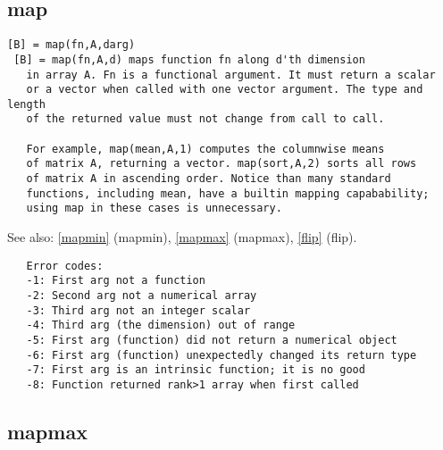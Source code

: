 \documentclass[a4paper]{article}
\begin{document}
\subsection{map\label{map}}

\begin{tscreen}
\begin{verbatim}
[B] = map(fn,A,darg)
 [B] = map(fn,A,d) maps function fn along d'th dimension
   in array A. Fn is a functional argument. It must return a scalar
   or a vector when called with one vector argument. The type and length
   of the returned value must not change from call to call.

   For example, map(mean,A,1) computes the columnwise means
   of matrix A, returning a vector. map(sort,A,2) sorts all rows
   of matrix A in ascending order. Notice than many standard
   functions, including mean, have a builtin mapping capabability;
   using map in these cases is unnecessary.
\end{verbatim}

See also: \ref{mapmin} {(mapmin)}, \ref{mapmax} {(mapmax)}, \ref{flip} {(flip)}.
\begin{verbatim}
   Error codes:
   -1: First arg not a function
   -2: Second arg not a numerical array
   -3: Third arg not an integer scalar
   -4: Third arg (the dimension) out of range
   -5: First arg (function) did not return a numerical object
   -6: First arg (function) unexpectedly changed its return type
   -7: First arg is an intrinsic function; it is no good
   -8: Function returned rank>1 array when first called
\end{verbatim}
\end{tscreen}



\subsection{mapmax\label{mapmax}}
\end{document}
